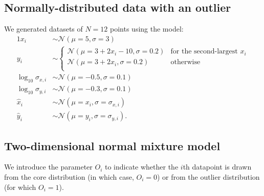 \documentclass[fleqn,usenatbib]{rasti}
\begin{document}
\subsection{Normally-distributed data with an outlier}
\label{sec:data-models.outlier}

We generated datasets of $N = 12$ points using the model:
\begin{alignat}{1}
    x_i& \sim \mathcal N (\mu = 5, \sigma = 3) \\
    y_i& \sim
    \begin{cases}
        \mathcal N (\mu = 3 + 2 x_i - 10, \sigma = 0.2) &
            \text{for the second-largest $x_i$} \\
        \mathcal N (\mu = 3 + 2 x_i, \sigma = 0.2) &
            \text{otherwise} \\
    \end{cases}\\
    \log_{10} \sigma_{x, i}& \sim \mathcal N (\mu = -0.5, \sigma = 0.1) \\
    \log_{10} \sigma_{y, i}& \sim \mathcal N (\mu = -0.3, \sigma = 0.1) \\
    \hat{x}_i& \sim \mathcal N (\mu = x_i, \sigma = \sigma_{x, i}) \\
    \hat{y}_i& \sim \mathcal N (\mu = y_i, \sigma = \sigma_{y, i}).
\end{alignat}

\subsection{Two-dimensional normal mixture model}
\label{sec:data-models.gmm}

We introduce the parameter $O_i$ to indicate whether the $i$th datapoint is
drawn from the core distribution (in which case, $O_i = 0$) or from the outlier
distribution (for which $O_i = 1$).
\end{document}
